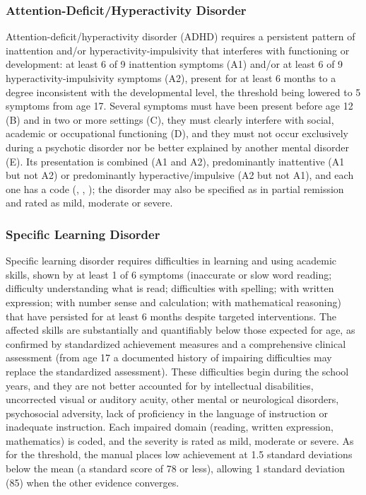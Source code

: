 \subsubsection{Attention-Deficit/Hyperactivity Disorder}

Attention-deficit/hyperactivity disorder (ADHD) requires a persistent pattern of
inattention and/or hyperactivity-impulsivity that interferes with functioning
or development: at least 6 of 9 inattention symptoms (A1) and/or at least 6 of
9 hyperactivity-impulsivity symptoms (A2), present for at least 6 months to a
degree inconsistent with the developmental level, the threshold being lowered
to 5 symptoms from age 17. Several symptoms must have been present before age
12 (B) and in two or more settings (C), they must clearly interfere with social,
academic or occupational functioning (D), and they must not occur exclusively
during a psychotic disorder nor be better explained by another mental disorder
(E). Its presentation is combined (A1 and A2), predominantly inattentive (A1
but not A2) or predominantly hyperactive/impulsive (A2 but not A1), and each one
has a code (, , ); the disorder may
also be specified as in partial remission and rated as mild, moderate or
severe.

\subsubsection{Specific Learning Disorder}

Specific learning disorder requires difficulties in learning and using academic
skills, shown by at least 1 of 6 symptoms (inaccurate or slow word reading;
difficulty understanding what is read; difficulties with spelling; with
written expression; with number sense and calculation; with mathematical
reasoning) that have persisted for at least 6 months despite targeted
interventions. The affected skills are substantially and quantifiably below
those expected for age, as confirmed by standardized achievement measures and
a comprehensive clinical assessment (from age 17 a documented history of
impairing difficulties may replace the standardized assessment). These difficulties begin during the school years, and they are not better accounted
for by intellectual disabilities, uncorrected visual or auditory acuity, other
mental or neurological disorders, psychosocial adversity, lack of proficiency
in the language of instruction or inadequate instruction. Each impaired
domain (reading, written expression, mathematics) is coded, and the severity is
rated as mild, moderate or severe. As for the threshold, the manual places low achievement at 1.5
standard deviations below the mean (a standard score of 78 or less), allowing 1
standard deviation (85) when the other evidence converges.

